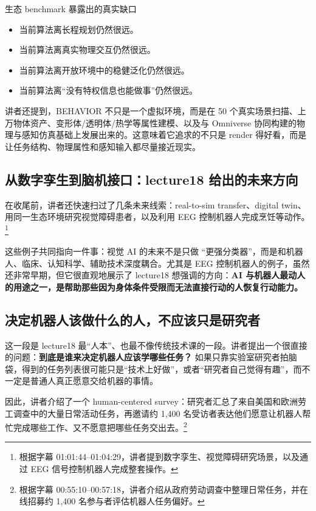 \documentclass[a4paper]{article}
\begin{document}
\begin{importantbox}{生态 benchmark 暴露出的真实缺口}
\begin{itemize}
    \item 当前算法离长程规划仍然很远。
    \item 当前算法离真实物理交互仍然很远。
    \item 当前算法离开放环境中的稳健泛化仍然很远。
    \item 当前算法离``没有特权信息也能做事''仍然很远。
\end{itemize}
\end{importantbox}

讲者还提到，BEHAVIOR 不只是一个虚拟环境，而是在 50 个真实场景扫描、上万物体资产、变形体/透明体/热学等属性建模、以及与 Omniverse 协同构建的物理与感知仿真基础上发展出来的。这意味着它追求的不只是 render 得好看，而是让任务结构、物理属性和感知输入都尽量接近现实。

\subsection{从数字孪生到脑机接口：lecture18 给出的未来方向}

在收尾前，讲者还快速扫过了几条未来线索：real-to-sim transfer、digital twin、用同一生态环境研究视觉障碍患者，以及利用 EEG 控制机器人完成烹饪等动作。\footnote{根据字幕 01:01:44--01:04:29，讲者提到数字孪生、视觉障碍研究场景，以及通过 EEG 信号控制机器人完成整套操作。}

这些例子共同指向一件事：视觉 AI 的未来不是只做 ``更强分类器''，而是和机器人、临床、认知科学、辅助技术深度耦合。尤其是 EEG 控制机器人的例子，虽然还非常早期，但它很直观地展示了 lecture18 想强调的方向：\textbf{AI 与机器人最动人的用途之一，是帮助那些因为身体条件受限而无法直接行动的人恢复行动能力。}

\subsection{决定机器人该做什么的人，不应该只是研究者}

这一段是 lecture18 最``人本''、也最不像传统技术课的一段。讲者提出一个很直接的问题：\textbf{到底是谁来决定机器人应该学哪些任务？} 如果只靠实验室研究者拍脑袋，得到的任务列表很可能只是``技术上好做''，或者``研究者自己觉得有趣''，而不一定是普通人真正愿意交给机器的事情。

因此，讲者介绍了一个 human-centered survey：研究者汇总了来自美国和欧洲劳工调查中的大量日常活动任务，再邀请约 1,400 名受访者表达他们愿意让机器人帮忙完成哪些工作、又不愿意把哪些任务交出去。\footnote{根据字幕 00:55:10--00:57:18，讲者介绍从政府劳动调查中整理日常任务，并在线招募约 1,400 名参与者评估机器人任务偏好。}
\end{document}
